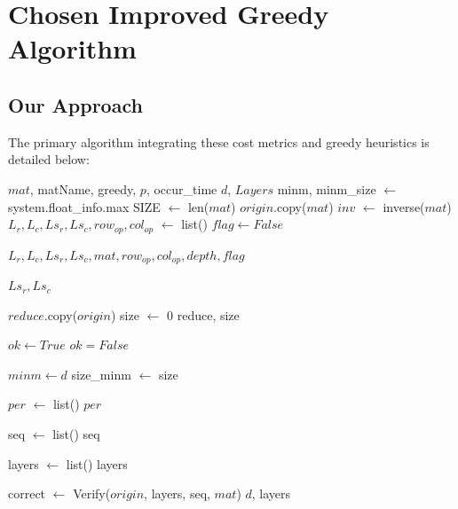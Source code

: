 \chapter{Chosen Improved Greedy Algorithm}
\section{Our Approach}
The primary algorithm integrating these cost metrics and greedy heuristics is detailed below:
\begin{algorithm}
\caption{Chosen Improved Greedy Algorithm}
\footnotesize
\begin{algorithmic}[1]
\Require $mat$, matName, greedy, $p$, occur\_time
\Ensure $d$, $Layers$
\State minm, minm\_size $\leftarrow$ system.float\_info.max
\State SIZE $\leftarrow$ len($mat$)
\State $origin$.copy($mat$)
\State $inv$ $\leftarrow$ inverse($mat$)
\State $L_{r}, L_{c}, Ls_{r}, Ls_{c}, row_{op}, col_{op}$ $\leftarrow$ list()
\State $flag \leftarrow False$

	\State \Return $L_{r}, L_{c}, Ls_{r}, Ls_{c}, mat, row_{op}, col_{op}, depth, flag$
\EndFunction

	\State \Return
\EndIf

	\State \Return $Ls_{r}, Ls_{c}$
\EndFunction

\State $reduce$.copy($origin$)
\State size $\leftarrow$ 0
	\State \Return reduce, size
\EndFunction

\State $ok \leftarrow True$
	\State $ok = False$
\EndIf

	\State \Return
\EndIf

\State $minm \leftarrow d$
\State size\_minm $\leftarrow$ size

\State $per$ $\leftarrow$ list()
	\State \Return $per$
\EndFunction

\State seq $\leftarrow$ list()
	\State \Return seq
\EndFunction

\State layers $\leftarrow$ list()
	\State \Return layers
\EndFunction

\State correct $\leftarrow$ Verify($origin$, layers, seq, $mat$)
	\State \Return
\EndIf
\State \Return $d$, layers
\end{algorithmic}
\end{algorithm}

